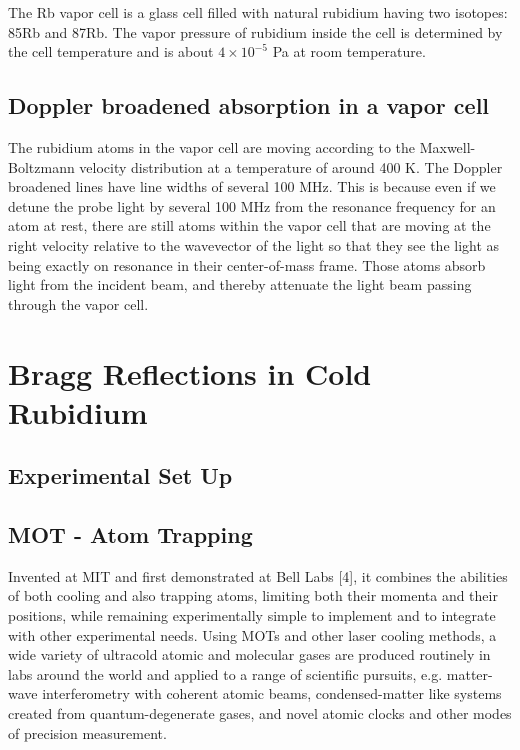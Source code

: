 \documentclass[10pt]{article}
\begin{document}
The Rb vapor cell is a glass cell filled with natural rubidium having two isotopes: 85Rb and
87Rb. The vapor pressure of rubidium inside
the cell is determined by the cell temperature
and is about $4 \times 10^{-5}$ Pa at room temperature.

\subsection*{Doppler broadened absorption in a vapor cell}
The rubidium atoms in the vapor cell are moving according to the Maxwell-Boltzmann velocity distribution at a temperature of around 400 K. The Doppler broadened lines have line widths of several 100 MHz. This is because even if we detune the probe light by several 100 MHz from the resonance frequency for an atom at rest, there are still atoms within the vapor cell that are moving at the right velocity relative to the wavevector of the light so that they see the light as being exactly on resonance in their center-of-mass frame. Those atoms absorb light from the incident beam, and thereby attenuate the light beam passing through the vapor cell.

\section*{Bragg Reflections in Cold Rubidium}




\subsection*{Experimental Set Up}


\subsection*{MOT - Atom Trapping}
Invented at MIT and first demonstrated at Bell Labs [4], it combines the abilities of both cooling and also trapping atoms, limiting both their momenta and their positions, while remaining experimentally simple to implement and to integrate with other experimental needs. Using MOTs and other laser cooling methods, a wide variety of ultracold atomic and molecular gases are produced routinely in labs around the world and applied to a range of scientific pursuits, e.g. matter-wave interferometry with coherent atomic beams, condensed-matter like systems created from quantum-degenerate gases, and novel atomic clocks and other modes of precision measurement.
\end{document}
